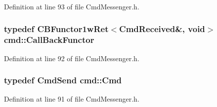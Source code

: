 Definition at line 93 of file Cmd\+Messenger.\+h.

\hypertarget{namespacecmd_a24926dd0c7587e1961fd9ebe0259beea}{
\subsubsection[{Call\+Back\+Functor}]{\setlength{\rightskip}{0pt plus 5cm}typedef {\bf C\+B\+Functor1w\+Ret}$<${\bf Cmd\+Received}\&, void$>$ {\bf cmd\+::\+Call\+Back\+Functor}}}\label{namespacecmd_a24926dd0c7587e1961fd9ebe0259beea}


Definition at line 92 of file Cmd\+Messenger.\+h.

\hypertarget{namespacecmd_af9b58ca395c80edd1335e21d1b9f4c99}{
\subsubsection[{Cmd}]{\setlength{\rightskip}{0pt plus 5cm}typedef {\bf Cmd\+Send} {\bf cmd\+::\+Cmd}}}\label{namespacecmd_af9b58ca395c80edd1335e21d1b9f4c99}


Definition at line 91 of file Cmd\+Messenger.\+h.

